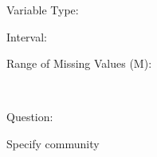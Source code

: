 \documentclass[
]{article}
\begin{document}
\begin{minipage}[t]{0.3\linewidth}

Variable Type:

\end{minipage}%
\begin{minipage}[t]{0.7\linewidth}

\end{minipage}

\begin{minipage}[t]{0.3\linewidth}

Interval:

\end{minipage}%
\begin{minipage}[t]{0.7\linewidth}

\end{minipage}

\begin{minipage}[t]{0.3\linewidth}

Range of Missing Values (M):

\end{minipage}%
\begin{minipage}[t]{0.7\linewidth}

~

\end{minipage}

\begin{minipage}[t]{0.3\linewidth}

Question:

\end{minipage}%
\begin{minipage}[t]{0.7\linewidth}

Specify community

\end{minipage}
\end{document}
